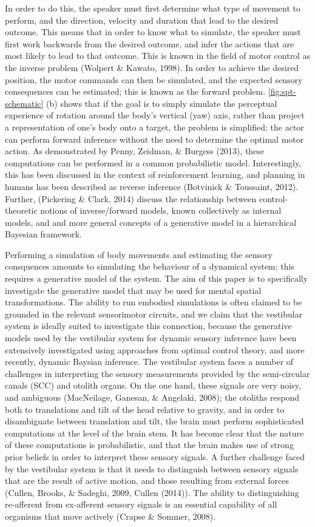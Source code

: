 \documentclass[english,floatsintext,man]{apa6}
\theoremstyle{definition}
\theoremstyle{definition}
\theoremstyle{remark}
\begin{document}
In order to do this, the speaker must first determine what type of
movement to perform, and the direction, velocity and duration that lead
to the desired outcome. This means that in order to know what to
simulate, the speaker must first work backwards from the desired
outcome, and infer the actions that are most likely to lead to that
outcome. This is known in the field of motor control as the inverse
problem (Wolpert \& Kawato, 1998). In order to achieve the desired
position, the motor commands can then be simulated, and the expected
sensory consequences can be estimated; this is known as the forward
problem. \cref{fig:spt-schematic} (b) shows that if the
goal is to simply simulate the perceptual experience of rotation around
the body's vertical (yaw) axis, rather than project a representation of
one's body onto a target, the problem is simplified; the actor can
perform forward inference without the need to determine the optimal
motor action. As demonstrated by Penny, Zeidman, \& Burgess (2013),
these computations can be performed in a common probabilistic model.
Interestingly, this has been discussed in the context of reinforcement
learning, and planning in humans has been described as reverse inference
(Botvinick \& Toussaint, 2012). Further, (Pickering \& Clark, 2014)
discuss the relationship between control-theoretic notions of
inverse/forward models, known collectively as internal models, and and
more general concepts of a generative model in a hierarchical Bayesian
framework.

Performing a simulation of body movements and estimating the sensory
consquences amounts to simulating the behaviour of a dynamical system;
this requires a generative model of the system. The aim of this paper is
to specifically investigate the generative model that may be used for
mental spatial transformations. The ability to run embodied simulations
is often claimed to be grounded in the relevant sensorimotor circuits,
and we claim that the vestibular system is ideally suited to investigate
this connection, because the generative models used by the vestibular
system for dynamic sensory inference have been extensively investigated
using approaches from optimal control theory, and more recently, dynamic
Baysian inference. The vestibular system faces a number of challenges in
interpreting the sensory measurements provided by the semi-circular
canals (SCC) and otolith organs. On the one hand, these signals are very
noisy, and ambiguous (MacNeilage, Ganesan, \& Angelaki, 2008); the
otoliths respond both to translations and tilt of the head relative to
gravity, and in order to disambiguate between translation and tilt, the
brain must perform sophisticated computations at the level of the brain
stem. It has become clear that the nature of these computations is
probabilistic, and that the brain makes use of strong prior beliefs in
order to interpret these sensory signals. A further challenge faced by
the vestibular system is that it needs to distinguish between sensory
signals that are the result of active motion, and those resulting from
external forces (Cullen, Brooks, \& Sadeghi, 2009, Cullen (2014)). The
ability to distinguishing re-afferent from ex-afferent sensory signals
is an essential capability of all organisms that move actively (Crapse
\& Sommer, 2008).
\end{document}
